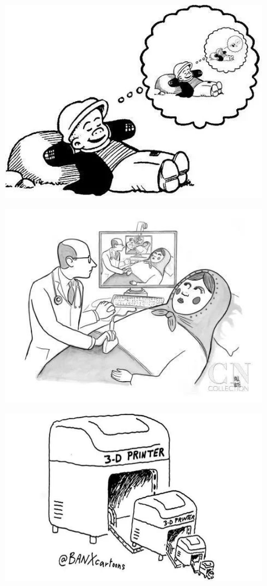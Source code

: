 \begin{figure}[H]
	\centering
	\includegraphics[scale=0.6]{img/C5/5-5/2.png}
\end{figure}

\begin{figure}[H]
	\centering
	\includegraphics[scale=0.6]{img/C5/5-5/3.png}
\end{figure}

\begin{figure}[H]
	\centering
	\includegraphics[scale=1.3]{img/C5/5-5/4.png}
\end{figure}

